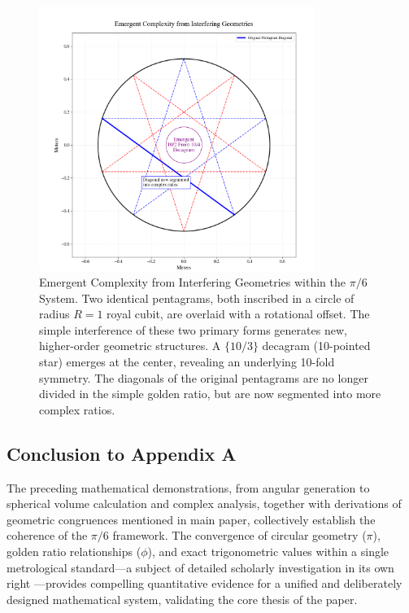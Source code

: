 \documentclass[11pt]{article}
\begin{document}
\begin{figure}[h!]
\centering
\includegraphics[width=0.8\textwidth]{figures/interfering-fig.png}
\caption{Emergent Complexity from Interfering Geometries within the $\pi/6$ System. Two identical pentagrams, both inscribed in a circle of radius $R = 1$ royal cubit, are overlaid with a rotational offset. The simple interference of these two primary forms generates new, higher-order geometric structures. A $\{10/3\}$ decagram (10-pointed star) emerges at the center, revealing an underlying 10-fold symmetry. The diagonals of the original pentagrams are no longer divided in the simple golden ratio, but are now segmented into more complex ratios.}
\label{fig:interfering_geometries}
\end{figure}

\subsection*{Conclusion to Appendix A}
The preceding mathematical demonstrations, from angular generation to spherical volume calculation and complex analysis, together with derivations of geometric congruences mentioned in main paper, collectively establish the coherence of the $\pi/6$ framework. The convergence of circular geometry ($\pi$), golden ratio relationships ($\phi$), and exact trigonometric values within a single metrological standard---a subject of detailed scholarly investigation in its own right \cite{herz-fischler2000shape}---provides compelling quantitative evidence for a unified and deliberately designed mathematical system, validating the core thesis of the paper.
\end{document}
